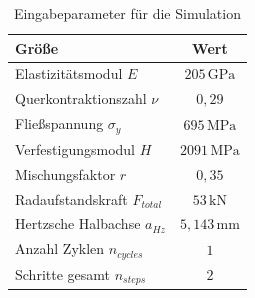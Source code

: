 \begin{table}[h!]
\caption{Eingabeparameter für die Simulation}
\centering
\begin{tabular}{l c}
\hline
Größe & Wert \\
\hline
Elastizitätsmodul $E$ & $205\,\mathrm{GPa}$ \\
Querkontraktionszahl $\nu$ & $0{,}29$ \\
Fließspannung $\sigma_y$ & $695\,\mathrm{MPa}$ \\
Verfestigungsmodul $H$ & $2091\,\mathrm{MPa}$ \\
Mischungsfaktor $r$ & $0{,}35$ \\
Radaufstandskraft $F_{total}$ & $53\,\mathrm{kN}$ \\
Hertzsche Halbachse $a_{Hz}$ & $5{,}143\,\mathrm{mm}$ \\
Anzahl Zyklen $n_{cycles}$ & $1$ \\
Schritte gesamt $n_{steps}$ & $2$ \\
\hline
\end{tabular}
\label{tab:simulation_parameters}
\end{table}
